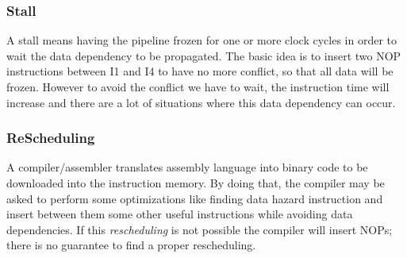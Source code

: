 \subsubsection{Stall}
  A stall means having the pipeline frozen for one or more clock cycles in order
  to wait the data dependency to be propagated. The basic idea is to insert two
  NOP instructions between I1 and I4 to have no more conflict, so that all data
  will be frozen. However to avoid the conflict we have to wait, the instruction
  time will increase and there are a lot of situations where this data
  dependency can occur.
\subsubsection{ReScheduling}
   A compiler/assembler translates assembly language into binary code to be
   downloaded into the instruction memory. By doing that, the compiler may be
   asked to perform some optimizations like finding data hazard instruction and
   insert between them some other useful instructions while avoiding data
   dependencies. If this \textit{rescheduling} is not possible the compiler will insert
   NOPs; there is no guarantee to find a proper rescheduling.





